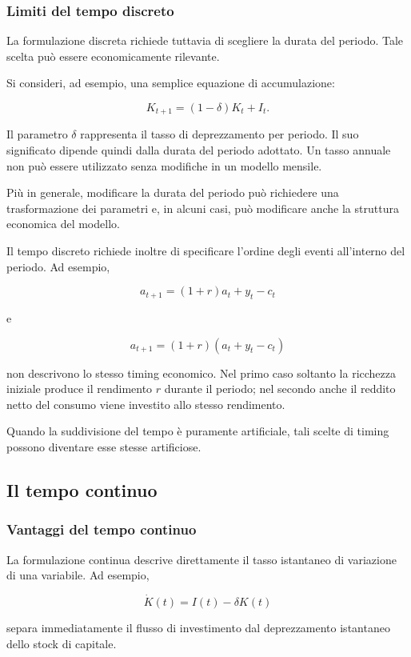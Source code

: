 \documentclass{book}
\begin{document}
\subsubsection{Limiti del tempo discreto}

La formulazione discreta richiede tuttavia di scegliere la durata del periodo. Tale scelta può essere economicamente rilevante.

Si consideri, ad esempio, una semplice equazione di accumulazione:

$$
K_{t+1}=(1-\delta)K_t+I_t.
$$

Il parametro $\delta$ rappresenta il tasso di deprezzamento per periodo. Il suo significato dipende quindi dalla durata del periodo adottato. Un tasso annuale non può essere utilizzato senza modifiche in un modello mensile.

Più in generale, modificare la durata del periodo può richiedere una trasformazione dei parametri e, in alcuni casi, può modificare anche la struttura economica del modello.

Il tempo discreto richiede inoltre di specificare l'ordine degli eventi all'interno del periodo. Ad esempio,

$$
a_{t+1}=(1+r)a_t+y_t-c_t
$$

e

$$
a_{t+1}=(1+r)(a_t+y_t-c_t)
$$

non descrivono lo stesso timing economico. Nel primo caso soltanto la ricchezza iniziale produce il rendimento $r$ durante il periodo; nel secondo anche il reddito netto del consumo viene investito allo stesso rendimento.

Quando la suddivisione del tempo è puramente artificiale, tali scelte di timing possono diventare esse stesse artificiose.


\subsection{Il tempo continuo}
\subsubsection{Vantaggi del tempo continuo}

La formulazione continua descrive direttamente il tasso istantaneo di variazione di una variabile. Ad esempio,

$$
\dot K(t)=I(t)-\delta K(t)
$$

separa immediatamente il flusso di investimento dal deprezzamento istantaneo dello stock di capitale.
\end{document}
